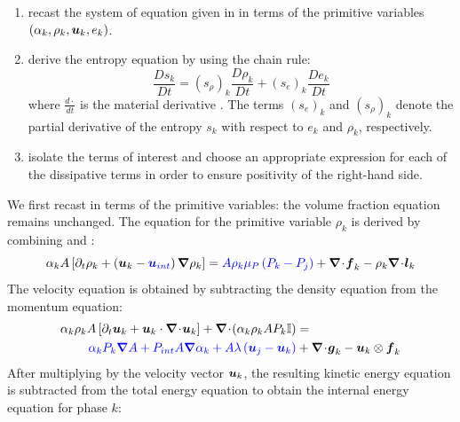 \begin{enumerate}
\item recast the system of equation given in  in terms of the primitive variables $(\alpha_k, \rho_k, \boldsymbol u_k, e_k)$.
\item derive the entropy equation by using the chain rule:
\begin{equation}
\label{eq:chain_rule-sct4}
\frac{Ds_k}{Dt} = \left( s_{\rho} \right)_k \frac{D \rho_k}{Dt} + \left( s_{e} \right)_k \frac{D e_k}{Dt} 
\end{equation}
where $\frac{d \cdot}{dt}$ is the material derivative . The terms $(s_e)_k$ and $(s_{\rho})_k$ denote the partial derivative of the entropy $s_k$ with respect to $e_k$ and $\rho_k$, respectively.
\item isolate the terms of interest and choose an appropriate expression for each of the dissipative terms in order to ensure positivity of the right-hand side.
\end{enumerate}
%
We first recast  in terms of the primitive variables: the volume fraction equation remains unchanged. The equation for the primitive variable $\rho_k$ is derived by combining  and :
%
\begin{equation}\label{eq:rho-7-eqn-model-sect4}
\alpha_k A \left[ \partial_t \rho_k + \left( \boldsymbol u_k - \textcolor{blue}{\boldsymbol u_{int}} \right) \boldsymbol{\nabla} \rho_k \right] = \textcolor{blue}{A \rho_k \mu_P \left( P_k - P_j \right)} + \boldsymbol{\nabla}\! \cdot \! \boldsymbol f_k - \rho_k \boldsymbol{\nabla}\! \cdot \! \boldsymbol l_k
\end{equation}
%
The velocity equation is obtained by subtracting the density equation from the momentum equation:
%
\begin{align}\label{eq:vel-7-eqn-model-sect4}
\alpha_k \rho_k  A \left[ \partial_t \boldsymbol u_k + \boldsymbol u_k \cdot \boldsymbol{\nabla}\! \cdot \! \boldsymbol u_k \right]  + \boldsymbol{\nabla}\! \cdot \! \left( \alpha_k \rho_k A P_k \mathbb{I} \right) &=\nonumber\\
\textcolor{blue}{\alpha_k P_k \boldsymbol{\nabla} A + P_{int} A \boldsymbol{\nabla} \alpha_k + A \lambda \left( \boldsymbol u_j - \boldsymbol u_k \right)} &+ \boldsymbol{\nabla}\! \cdot \! \boldsymbol g_k - \boldsymbol u_k \otimes \boldsymbol f_k
\end{align}
%
After multiplying  by the velocity vector $\boldsymbol u_k$, the resulting kinetic energy equation is subtracted from the total energy equation to obtain the internal energy equation for phase $k$:
